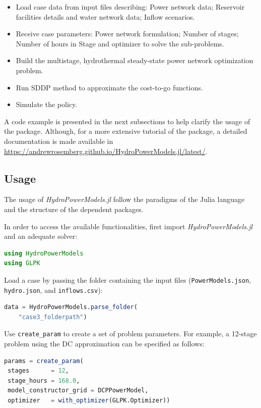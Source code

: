 \documentclass{juliacon}
\begin{document}
\begin{itemize}
    \item Load case data from input files describing: Power network data; Reservoir facilities details and water network data; Inflow scenarios.
    \item Receive case parameters: Power network formulation; Number of stages; Number of hours in Stage and optimizer to solve the sub-problems. 
    \item Build the multistage, hydrothermal steady-state power network optimization problem.
    \item Run SDDP method to approximate the cost-to-go functions.
    \item Simulate the policy.
\end{itemize}

A code example is presented in the next subsections to help clarify the usage of the package. Although, for a more extensive tutorial of the package, a detailed documentation is made available in \url{https://andrewrosemberg.github.io/HydroPowerModels.jl/latest/}.

\subsection{Usage}
\label{subsub:usagehpm}
The usage of \textit{HydroPowerModels.jl} follow the paradigms of the Julia language and the structure of the dependent packages.

In order to access the available functionalities, first import \textit{HydroPowerModels.jl} and an adequate solver:

\begin{lstlisting}[language = Julia]
using HydroPowerModels
using GLPK
\end{lstlisting}

Load a case by passing the folder containing the input files (\texttt{PowerModels.json}, \texttt{hydro.json}, and \texttt{inflows.csv}):

\begin{lstlisting}[language = Julia]
data = HydroPowerModels.parse_folder(
    "case3_folderpath")
\end{lstlisting}

Use \texttt{create\_param} to create a set of problem parameters. For example, a 12-stage problem using the DC approximation can be specified as follows:
\begin{lstlisting}[language = Julia]
params = create_param( 
 stages      = 12, 
 stage_hours = 168.0,
 model_constructor_grid = DCPPowerModel,
 optimizer   = with_optimizer(GLPK.Optimizer))
\end{lstlisting}
    
\end{document}
